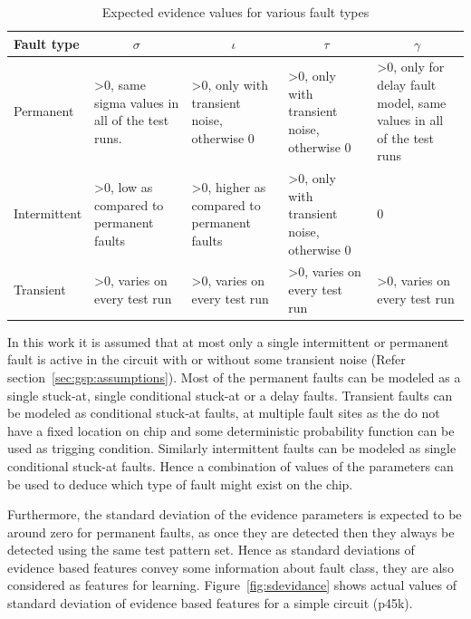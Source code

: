\begin{table}[h]
\captionsetup{justification=centering}

\begin{tabular}{p{2cm}p{2.5cm}p{2.5cm}p{2.5cm}p{2.5cm}}
\hline
Fault type   & \multicolumn{1}{c}{$\sigma$}                              & \multicolumn{1}{c}{$\iota$}                           & \multicolumn{1}{c}{$\tau$}                            & \multicolumn{1}{c}{$\gamma$}                                                   \\ \hline
Permanent    & \textgreater0, same sigma values in all of the test runs. & \textgreater0, only with transient noise, otherwise 0 & \textgreater0, only with transient noise, otherwise 0 & \textgreater0, only for delay fault model, same values in all of the test runs \\
Intermittent & \textgreater0, low as compared to permanent faults        & \textgreater0, higher as compared to permanent faults & \textgreater0, only with transient noise, otherwise 0 & 0                                                                              \\
Transient    & \textgreater0, varies on every test run                     & \textgreater0, varies on every test run                 & \textgreater0, varies on every test run                 & \textgreater0, varies on every test run                                         \\
\hline
\end{tabular}

\caption{Expected evidence values for various fault types}
\label{tab:diagparam}
\end{table}


In this work it is assumed that at most only a single intermittent or permanent fault is active in the circuit with or without some transient noise (Refer section~\ref{sec:gsp:assumptions}). Most of the permanent faults can be modeled as a single stuck-at, single conditional stuck-at or a delay faults. Transient faults can be modeled as conditional stuck-at faults, at multiple fault sites as the do not have a fixed location on chip and some deterministic probability function can be used as trigging condition. Similarly intermittent faults can be modeled as single conditional stuck-at faults. Hence a combination of values of the parameters can be used to deduce which type of fault might exist on the chip.

Furthermore, the standard deviation of the evidence parameters is expected to be around zero for permanent faults, as once they are detected then they always be detected using the same test pattern set. Hence as standard deviations of evidence based features convey some information about fault class, they are also considered as features for learning. Figure~\ref{fig:sdevidance} shows actual values of standard deviation of evidence based features for a simple circuit (p45k).

